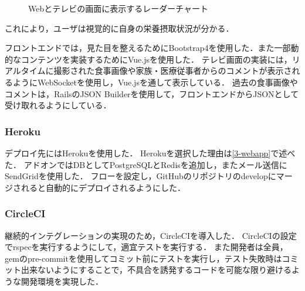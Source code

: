 \documentclass[../report]{subfiles}
\begin{document}
\begin{figure}[htbp]
    \begin{center}
        \caption{Webとテレビの画面に表示するレーダーチャート}
        \label{fig:6-radarchart}
    \end{center}
\end{figure}

これにより，ユーザは視覚的に自身の栄養摂取状況が分かる．

フロントエンドでは，見た目を整えるためにBootstrap4を使用した．また一部動的なコンテンツを実装するためにVue.jsを使用した．
テレビ画面の実装には，リアルタイムに撮影された食事画像や家族・医療従事者からのコメントが表示されるようにWebSocketを使用し，Vue.jsを通して表示している．
過去の食事画像やコメントは，RailsのJSON Builderを使用して，フロントエンドからJSONとして受け取れるようにしている．

\subsubsection{Heroku}
デプロイ先にはHerokuを使用した．
Herokuを選択した理由は\ref{3-webapp}で述べた．
アドオンではDBとしてPostgreSQLとRedisを追加し，またメール送信にSendGridを使用した．
フローを設定し，GitHubのリポジトリのdevelopにマージされると自動的にデプロイされるようにした．

\subsubsection{CircleCI}
継続的インテグレーションの実現のため，CircleCIを導入した．
CircleCIの設定でrspecを実行するようにして，適宜テストを実行する．
また開発者は全員，gemのpre-commitを使用してコミット前にテストを実行し，テスト失敗時はコミット出来ないようにすることで，不具合を誘発するコードを可能な限り避けるような開発環境を実現した．
\end{document}
